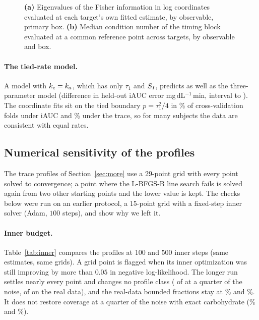 \begin{figure}[tbp]
\centering
{}
\caption{\textbf{(a)} Eigenvalues of the Fisher information in log coordinates evaluated at each target's own fitted estimate, by observable, primary
box. \textbf{(b)} Median condition number of the timing block evaluated at a common reference point across targets, by observable
and box.}
\label{fig:fisher}
\end{figure}

\paragraph{The tied-rate model.}
A model with $k_e=k_a$, which has only $\tau_1$ and $S_I$, predicts as well as the three-parameter model (difference in
held-out iAUC error \resTiedDiff{} mg\,dL$^{-1}$\,min, interval \resTiedDiffLow{} to \resTiedDiffHigh). The coordinate
fits sit on the tied boundary $p=\tau_1^2/4$ in \resBoundaryCoords\% of cross-validation folds under iAUC and
\resBoundaryCoordsTrace\% under the trace, so for many subjects the data are consistent with equal rates.

\subsection{Numerical sensitivity of the profiles}
\label{apx:numerics}

The trace profiles of Section~\ref{sec:more} use a $29$-point grid with every point solved to convergence; a point
where the L-BFGS-B line search fails is solved again from two other starting points and the lower value is kept.
The checks below were run on an earlier protocol, a $15$-point grid with a fixed-step inner solver (Adam, $100$ steps),
and show why we left it.

\paragraph{Inner budget.}
Table~\ref{tab:inner} compares the profiles at $100$ and $500$ inner steps (same estimates, same grids). A grid point is flagged
when its inner optimization was still improving by more than $0.05$ in negative log-likelihood. The longer run settles nearly
every point and changes no profile class (\resInnerQuarterChanged{} of \resInnerQuarterChangedOf{} at a quarter of the noise,
\resInnerRealChanged{} of \resInnerRealChangedOf{} on the real data), and the real-data bounded fractions stay at
\resInnerRealFiveHundredBoundedTau\% and \resInnerRealFiveHundredBoundedP\%. It does not restore coverage at a quarter of the
noise with exact carbohydrate (\resInnerQuarterFiveHundredCoverTau\% and \resInnerQuarterFiveHundredCoverP\%).

